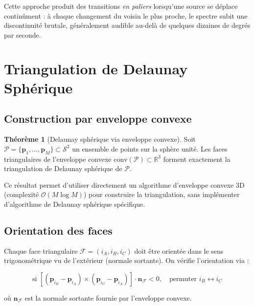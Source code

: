 \documentclass[12pt, a4paper]{article}
\theoremstyle{definition}
\newtheorem{theoreme}{Théorème}[section]
\newcommand{\R}{\mathbb{R}}
\newcommand{\vect}[1]{\bm{#1}}
\newcommand{\cross}{\times}
\begin{document}
Cette approche produit des transitions \emph{en paliers} lorsqu'une source se
déplace continûment : à chaque changement du voisin le plus proche, le
spectre subit une discontinuité brutale, généralement audible au-delà de
quelques dizaines de degrés par seconde.

\section{Triangulation de Delaunay Sphérique}

\subsection{Construction par enveloppe convexe}

\begin{theoreme}[Delaunay sphérique via enveloppe convexe]
  Soit $\mathcal{P} = \{\vect{p}_1, \ldots, \vect{p}_M\} \subset \mathcal{S}^2$
  un ensemble de points sur la sphère unité. Les faces triangulaires de
  l'enveloppe convexe $\mathrm{conv}(\mathcal{P}) \subset \R^3$ forment
  exactement la triangulation de Delaunay sphérique de $\mathcal{P}$.
\end{theoreme}

Ce résultat permet d'utiliser directement un algorithme d'enveloppe convexe 3D
(complexité $\mathcal{O}(M \log M)$) pour construire la triangulation, sans
implémenter d'algorithme de Delaunay sphérique spécifique.

\subsection{Orientation des faces}

Chaque face triangulaire $\mathcal{F} = (i_A, i_B, i_C)$ doit être orientée
dans le sens trigonométrique vu de l'extérieur (normale sortante). On vérifie
l'orientation via :

\begin{equation}
  \text{si } \left[(\vect{p}_{i_B} - \vect{p}_{i_A}) \cross
  (\vect{p}_{i_C} - \vect{p}_{i_A})\right] \cdot \vect{n}_{\mathcal{F}} < 0,
  \quad \text{permuter } i_B \leftrightarrow i_C
\end{equation}

où $\vect{n}_{\mathcal{F}}$ est la normale sortante fournie par l'enveloppe
convexe.
\end{document}
